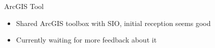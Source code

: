 




\begin{frame}{ArcGIS Tool}
    \centering
    \begin{itemize}
        \item Shared ArcGIS toolbox with SIO, initial reception seems good
        \item Currently waiting for more feedback about it
    \end{itemize}
\end{frame}

